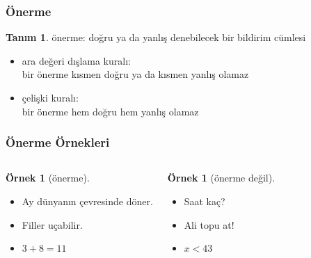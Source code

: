 \documentclass[dvipsnames]{beamer}
\theoremstyle{definition}
\newtheorem{tanim}[theorem]{Tanım}
\theoremstyle{example}
\newtheorem{ornek}[theorem]{Örnek}
\theoremstyle{plain}
\begin{document}
\begin{frame}
  \frametitle{Önerme}

  \begin{tanim}
    \alert{önerme}: doğru ya da yanlış denebilecek bir bildirim cümlesi
  \end{tanim}

  \pause
  \begin{itemize}
    \item \alert{ara değeri dışlama kuralı}:\\
      bir önerme kısmen doğru ya da kısmen yanlış olamaz
  \end{itemize}

  \pause
  \begin{itemize}
    \item \alert{çelişki kuralı}:\\
      bir önerme hem doğru hem yanlış olamaz
  \end{itemize}
\end{frame}

\begin{frame}
  \frametitle{Önerme Örnekleri}

  \begin{columns}[t]
    \begin{ornek}[önerme]
      \begin{itemize}
        \item Ay dünyanın çevresinde döner.
        \item Filler uçabilir.
        \item $3+8=11$
      \end{itemize}
    \end{ornek}

    \pause
    \begin{ornek}[önerme değil]
      \begin{itemize}
        \item Saat kaç?
        \item Ali topu at!
        \item $x<43$
      \end{itemize}
    \end{ornek}
  \end{columns}
\end{frame}
\end{document}
